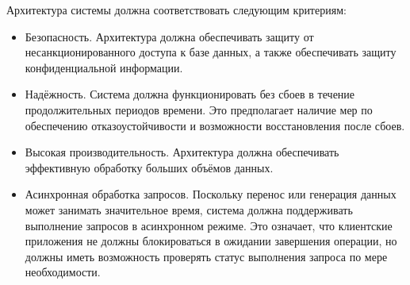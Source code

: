 Архитектура системы должна соответствовать следующим критериям:

\begin{itemize}
    \item Безопасность. Архитектура должна обеспечивать защиту от несанкционированного доступа к базе данных, а также обеспечивать защиту конфиденциальной информации.
    \item Надёжность. Система должна функционировать без сбоев в течение продолжительных периодов времени. Это предполагает наличие мер по обеспечению отказоустойчивости и возможности восстановления после сбоев.
    \item Высокая производительность. Архитектура должна обеспечивать эффективную обработку больших объёмов данных.
    \item Асинхронная обработка запросов. Поскольку перенос или генерация данных может занимать значительное время, система должна поддерживать выполнение запросов в асинхронном режиме. Это означает, что клиентские приложения не должны блокироваться в ожидании завершения операции, но должны иметь возможность проверять статус выполнения запроса по мере необходимости.
\end{itemize}
